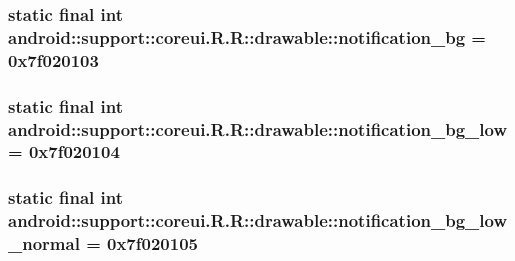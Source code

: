 \hypertarget{classandroid_1_1support_1_1coreui_1_1_r_1_1drawable_e63ad2c8565a949023a970d255ead927}{
\subsubsection[{notification\_\-bg}]{\setlength{\rightskip}{0pt plus 5cm}static final int android::support::coreui.R.R::drawable::notification\_\-bg = 0x7f020103}}
\label{classandroid_1_1support_1_1coreui_1_1_r_1_1drawable_e63ad2c8565a949023a970d255ead927}


\hypertarget{classandroid_1_1support_1_1coreui_1_1_r_1_1drawable_742874347370d758feb41ce55b408695}{
\subsubsection[{notification\_\-bg\_\-low}]{\setlength{\rightskip}{0pt plus 5cm}static final int android::support::coreui.R.R::drawable::notification\_\-bg\_\-low = 0x7f020104}}
\label{classandroid_1_1support_1_1coreui_1_1_r_1_1drawable_742874347370d758feb41ce55b408695}


\hypertarget{classandroid_1_1support_1_1coreui_1_1_r_1_1drawable_f4c7c39b19df870afbb79e34dde28164}{
\subsubsection[{notification\_\-bg\_\-low\_\-normal}]{\setlength{\rightskip}{0pt plus 5cm}static final int android::support::coreui.R.R::drawable::notification\_\-bg\_\-low\_\-normal = 0x7f020105}}
\label{classandroid_1_1support_1_1coreui_1_1_r_1_1drawable_f4c7c39b19df870afbb79e34dde28164}


